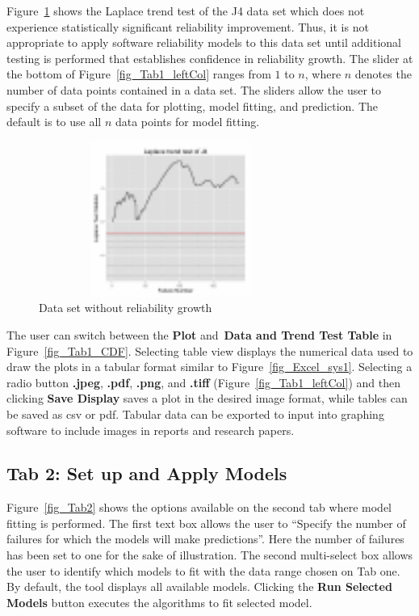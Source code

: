 \documentclass[journal]{IEEEtran}
\begin{document}
Figure~\ref{fig:J4Trend} shows the Laplace trend test of the J4 data set which does not experience statistically significant reliability improvement. Thus, it is not appropriate to apply software reliability models to this data set until additional testing is performed that establishes confidence in reliability growth. The slider at the bottom of Figure~\ref{fig_Tab1_leftCol} ranges from $1$ to $n$, where $n$ denotes the number of data points contained in a data set. The sliders allow the user to specify a subset of the data for plotting, model fitting, and prediction. The default is to use all $n$ data points for model fitting.

\begin{figure}[!h]
\centering
\includegraphics[width=3.4in,height=2in]{Figures/J4_Trend_LP}
\caption{Data set without reliability growth}
\label{fig:J4Trend}
\end{figure}

The user can switch between the \textbf{Plot} and~\textbf{Data and Trend Test Table} in Figure~\ref{fig_Tab1_CDF}. Selecting table view displays the numerical data used to draw the plots in a tabular format similar to Figure~\ref{fig_Excel_sys1}. Selecting a radio button \textbf{.jpeg}, \textbf{.pdf}, \textbf{.png}, and \textbf{.tiff} (Figure~\ref{fig_Tab1_leftCol}) and then clicking \textbf{Save Display} saves a plot in the desired image format, while tables can be saved as csv or pdf. Tabular data can be exported to input into graphing software to include images in reports and research papers.





\subsection{Tab 2: Set up and Apply Models}\label{tab2}
Figure~\ref{fig_Tab2} shows the options available on the second tab where model fitting is performed. The first text box allows the user to ``Specify the number of failures for which the models will make predictions''. Here the number of failures has been set to one for the sake of illustration. The second multi-select box allows the user to identify which models to fit with the data range chosen on Tab one. By default, the tool displays all available models. Clicking the \textbf{Run Selected Models} button executes the algorithms to fit selected model.
\end{document}
